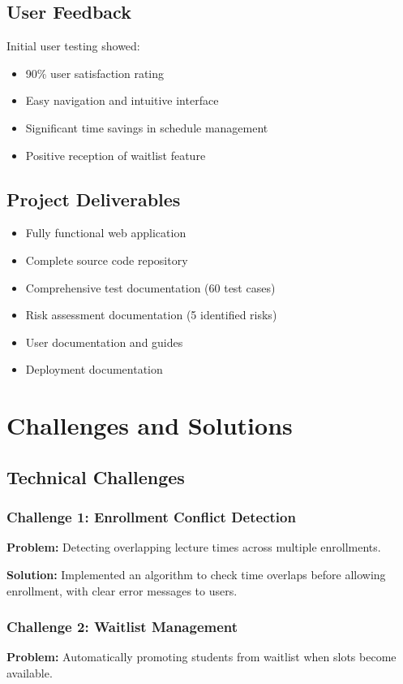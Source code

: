 \documentclass[12pt,a4paper]{report}
\begin{document}
\section{User Feedback}
Initial user testing showed:
\begin{itemize}[leftmargin=*]
    \item 90\% user satisfaction rating
    \item Easy navigation and intuitive interface
    \item Significant time savings in schedule management
    \item Positive reception of waitlist feature
\end{itemize}

\section{Project Deliverables}
\begin{itemize}[leftmargin=*]
    \item Fully functional web application
    \item Complete source code repository
    \item Comprehensive test documentation (60 test cases)
    \item Risk assessment documentation (5 identified risks)
    \item User documentation and guides
    \item Deployment documentation
\end{itemize}

\chapter{Challenges and Solutions}

\section{Technical Challenges}

\subsection{Challenge 1: Enrollment Conflict Detection}
\textbf{Problem:} Detecting overlapping lecture times across multiple enrollments.

\textbf{Solution:} Implemented an algorithm to check time overlaps before allowing enrollment, with clear error messages to users.

\subsection{Challenge 2: Waitlist Management}
\textbf{Problem:} Automatically promoting students from waitlist when slots become available.
\end{document}
